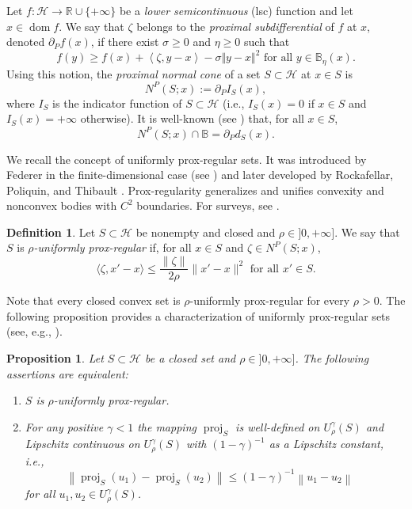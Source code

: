 \documentclass[preprint,12pt]{elsarticle}
\renewcommand{\H}{\mathcal{H}}
\DeclareMathOperator{\proj}{proj}
\theoremstyle{plain}
\newtheorem{proposition}[theorem]{Proposition}
\theoremstyle{definition}
\newtheorem{definition}[theorem]{Definition}
\theoremstyle{remark}
\begin{document}
	\noindent Let $f\colon \H\to \mathbb{R}\cup\{+\infty\}$ be a \emph{lower semicontinuous} (lsc) function and let $x\in \operatorname{dom}f$. We say that $\zeta$ belongs to the \emph{proximal subdifferential}   of $f$ at $x$, denoted  $\partial_P f(x)$, if there exist $\sigma\geq 0$ and $\eta\geq 0$ such that
		\begin{equation*}
			f(y)\geq f(x)+\left\langle \zeta,y-x\right\rangle -\sigma\Vert y-x\Vert^2 \textrm{ for all } y\in \mathbb{B}_{\eta}(x).
		\end{equation*}
	Using this notion, the \emph{proximal normal cone} of a set $S\subset \H$ at $x\in S$ is
	$$
	N^P(S;x):=\partial_P I_S(x),
	$$
	where $I_S$ is the indicator function of $S\subset \H$ (i.e., $I_S(x)=0$ if $x\in S$ and $I_S(x)=+\infty$ otherwise). It is well-known (see \cite[Theorem 4.1]{MR1870754}) that, for all $x\in S$, 
	\begin{equation}\label{normal-distancia}
		N^{P}(S;x)\cap \mathbb{B}=\partial_P d_S(x).
	\end{equation}
	
	We recall the concept of uniformly prox-regular sets. It was introduced by Federer in the finite-dimensional case (see \cite{MR110078}) and later developed by Rockafellar, Poliquin, and Thibault \cite{Poliquin2000}.  Prox-regularity generalizes and unifies convexity and nonconvex bodies with $C^2$ boundaries. For surveys, see \cite{MR2768810,Thibault-2023-II}.
	
\begin{definition}
Let $S\subset \H$ be nonempty and closed and $\rho\in ]0,+\infty]$. We say that $S$ is \emph{$\rho$-uniformly prox-regular} if, for all $x\in S$ and $\zeta\in N^P(S;x)$, 
		\begin{equation*}
			\langle \zeta,x'-x\rangle\leq \frac{\|\zeta\|}{2\rho}\|x'-x\|^2 \textrm{ for all } x'\in S.
		\end{equation*}
	\end{definition}
	Note that every closed convex set is $\rho$-uniformly prox-regular for every $\rho>0$. The following proposition provides a characterization of uniformly prox-regular sets 
	(see, e.g.,  \cite{MR2768810}). 
	\begin{proposition}\label{prox_reg_prop}
		Let $S\subset \H$ be a closed set and $\rho\in ]0,+\infty]$. The following assertions are equivalent:
		\begin{enumerate}
			\item [(a)] $S$ is $\rho$-uniformly prox-regular.
			\item [(b)] For any positive $\gamma<1$ the mapping $\proj_S$ is well-defined on $U_\rho^\gamma(S)$ and Lipschitz continuous on $U_\rho^\gamma(S)$ with $(1-\gamma)^{-1}$ as a Lipschitz constant, i.e.,
			$$\left\|\proj_S\left(u_1\right)-\proj_S\left(u_2\right)\right\| \leq(1-\gamma)^{-1}\left\|u_1-u_2\right\| \quad$$ for all $u_1, u_2 \in U_\rho^\gamma(S)$.
		\end{enumerate}
	\end{proposition}
\end{document}
